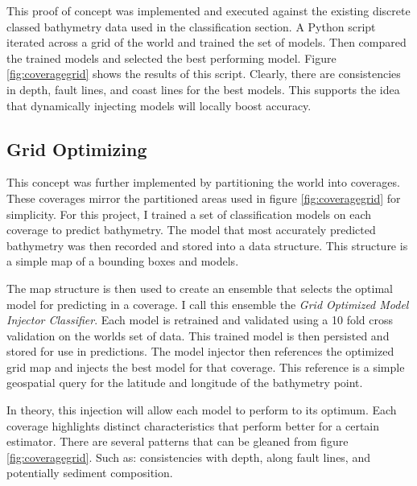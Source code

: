 \par
This proof of concept was implemented and executed against the existing discrete classed bathymetry data used in the classification section.
A Python script iterated across a grid of the world and trained the set of models.
Then compared the trained models and selected the best performing model.
Figure \ref{fig:coveragegrid} shows the results of this script.
Clearly, there are consistencies in depth, fault lines, and coast lines for the best models.
This supports the idea that dynamically injecting models will locally boost accuracy.

\subsection{Grid Optimizing}
This concept was further implemented by partitioning the world into coverages.
These coverages mirror the partitioned areas used in figure \ref{fig:coveragegrid} for simplicity.
For this project, I trained a set of classification models on each coverage to predict bathymetry.
The model that most accurately predicted bathymetry was then recorded and stored into a data structure.
This structure is a simple map of a bounding boxes and models.

\par
The map structure is then used to create an ensemble that selects the optimal model for predicting in a coverage.
I call this ensemble the \textit{Grid Optimized Model Injector Classifier}.
Each model is retrained and validated using a 10 fold cross validation on the worlds set of data.
This trained model is then persisted and stored for use in predictions.
The model injector then references the optimized grid map and injects the best model for that coverage.
This reference is a simple geospatial query for the latitude and longitude of the bathymetry point.

\par
In theory, this injection will allow each model to perform to its optimum.
Each coverage highlights distinct characteristics that perform better for a certain estimator.
There are several patterns that can be gleaned from figure \ref{fig:coveragegrid}. 
Such as: consistencies with depth, along fault lines, and potentially sediment composition. 


